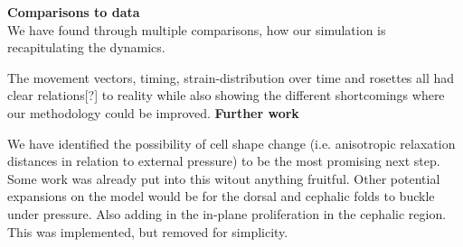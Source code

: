 \textbf{Comparisons to data}\\
We have found through multiple comparisons, how our simulation is recapitulating the dynamics.

The movement vectors, timing, strain-distribution over time and rosettes all had clear relations[?] to reality while also showing the different shortcomings where our methodology could be improved.
\textbf{Further work}

We have identified the possibility of cell shape change (i.e. anisotropic relaxation distances in relation to external pressure) to be the most promising next step. Some work was already put into this witout anything fruitful. Other potential expansions on the model would be for the dorsal and cephalic folds to buckle under pressure. Also adding in the in-plane proliferation in the cephalic region. This was implemented, but removed for simplicity.

